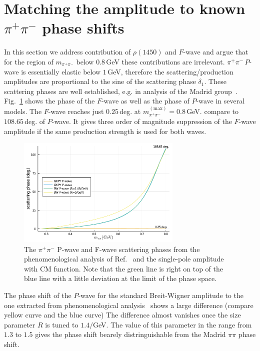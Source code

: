 \documentclass[aps,prd,superscriptaddress,onecolumn,nofootinbib,preprintnumbers,notitlepage]{revtex4-1}
\begin{document}
\section{Matching the amplitude to known $\pi^+\pi^-$ phase shifts}
In this section we address contribution of $\rho(1450)$ and $F$-wave
and argue that for the region of $m_{\pi^+\pi^-}$ below $0.8\,$GeV these contributions
are irrelevant. $\pi^+\pi^-\,P$-wave is essentially elastic below $1\,$GeV,
therefore the scattering/production amplitudes are proportional
to the sine of the scattering phase $\delta_1$.
These scattering phases are well established, e.g. in analysis of the Madrid group~\cite{GarciaMartin:2011cn}.
Fig.~\ref{fig:scatt.phases} shows the phase of the $F$-wave as well as the phase
of $P$-wave in several models. The $F$-wave reaches just $0.25\,$deg. at $m_{\pi^+\pi^-}^{(\text{max})}=0.8\,$GeV. compare to $108.65\,$deg. of $P$-wave.
It gives three order of magnitude suppression of the $F$-wave amplitude if the same production strength is used for both waves.
\begin{figure}
  \includegraphics[width=0.7\textwidth]{Pwave_phaseshift.pdf}
  \caption{The $\pi^+\pi^-$ P-wave and F-wave scattering phases from the phenomenological analysis of Ref.~\cite{GarciaMartin:2011cn} and the single-pole amplitude with CM function.
  Note that the green line is right on top of the blue line with a little deviation at the limit of the phase space.}
  \label{fig:scatt.phases}
\end{figure}
The phase shift of the $P$-wave for the standard Breit-Wigner amplitude to the one extracted from phenomenological analysis~\cite{GarciaMartin:2011cn} shows a large difference (compare yellow curve and the blue curve)
The difference almost vanishes once the size parameter $R$ is tuned to $1.4/$GeV.
The value of this parameter in the range from $1.3$ to $1.5$ gives the phase shift bearely distringuishable from the Madrid $\pi\pi$ phase shift.
\end{document}
